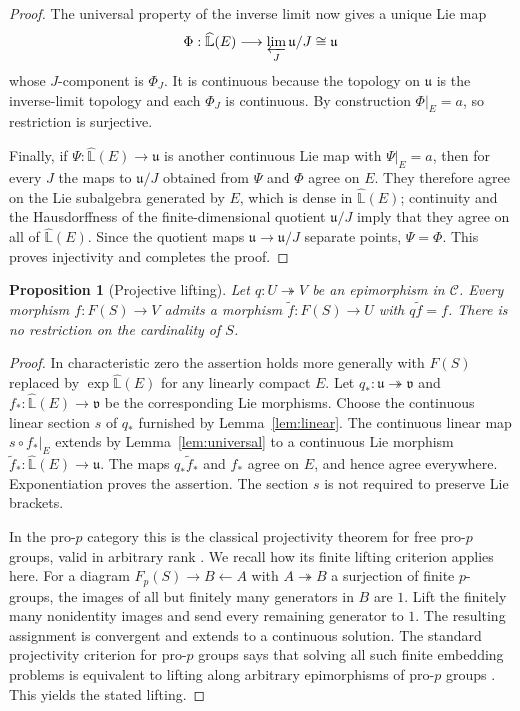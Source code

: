 \documentclass[11pt,a4paper]{article}
\newtheorem{proposition}[theorem]{Proposition}
\theoremstyle{definition}
\newcommand{\C}{\mathcal C}
\newcommand{\LL}{\widehat{\mathbb L}}
\begin{document}
\begin{proof}
The universal property of the inverse limit now gives a unique Lie map
\[
 \Phi:\LL(E)\longrightarrow\varprojlim_J\mathfrak u/J
       \cong\mathfrak u
\]
whose $J$-component is $\Phi_J$.  It is continuous because the topology on
$\mathfrak u$ is the inverse-limit topology and each $\Phi_J$ is
continuous.  By construction $\Phi|_E=a$, so restriction is surjective.

Finally, if $\Psi:\LL(E)\to\mathfrak u$ is another continuous Lie map
with $\Psi|_E=a$, then for every $J$ the maps to $\mathfrak u/J$ obtained
from $\Psi$ and $\Phi$ agree on $E$.  They therefore agree on the Lie
subalgebra generated by $E$, which is dense in $\LL(E)$; continuity and
the Hausdorffness of the finite-dimensional quotient $\mathfrak u/J$ imply
that they agree on all of $\LL(E)$.  Since the quotient maps
$\mathfrak u\to\mathfrak u/J$ separate points, $\Psi=\Phi$.
This proves injectivity and completes the proof.
\end{proof}

\begin{proposition}[Projective lifting]\label{prop:projective}
Let $q:U\twoheadrightarrow V$ be an epimorphism in $\C$.
Every morphism $f:F(S)\to V$ admits a morphism
$\widetilde f:F(S)\to U$ with $q\widetilde f=f$.
There is no restriction on the cardinality of $S$.
\end{proposition}
\begin{proof}
In characteristic zero the assertion holds more generally with
$F(S)$ replaced by $\exp\LL(E)$ for any linearly compact $E$.
Let $q_*:\mathfrak u\twoheadrightarrow\mathfrak v$ and
$f_*:\LL(E)\to\mathfrak v$ be the corresponding Lie morphisms.
Choose the continuous linear section $s$ of $q_*$ furnished by
Lemma~\ref{lem:linear}. The continuous linear map
$s\circ f_*|_E$ extends by Lemma~\ref{lem:universal} to a continuous
Lie morphism $\widetilde f_*:\LL(E)\to\mathfrak u$.
The maps $q_*\widetilde f_*$ and $f_*$ agree on $E$, and hence agree
everywhere. Exponentiation proves the assertion. The section $s$ is
not required to preserve Lie brackets.

In the pro-$p$ category this is the classical projectivity theorem for
free pro-$p$ groups, valid in arbitrary rank
\cite[Section~7.7]{RibesZalesskii}. We recall how its finite lifting
criterion applies here. For a diagram $F_p(S)\to B\leftarrow A$ with
$A\twoheadrightarrow B$ a surjection of finite $p$-groups, the images
of all but finitely many generators in $B$ are $1$. Lift the finitely
many nonidentity images and send every remaining generator to $1$.
The resulting assignment is convergent and extends to a continuous
solution. The standard projectivity criterion for pro-$p$ groups says
that solving all such finite embedding problems is equivalent to lifting
along arbitrary epimorphisms of pro-$p$ groups
\cite[Section~7.6]{RibesZalesskii}. This yields the stated lifting.
\end{proof}
\end{document}
